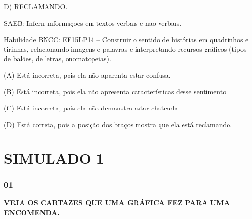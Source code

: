 D) RECLAMANDO.

SAEB: Inferir informações em textos verbais e não verbais.

Habilidade BNCC: EF15LP14 -- Construir o sentido de histórias em
quadrinhos e tirinhas, relacionando imagens e palavras e interpretando
recursos gráficos (tipos de balões, de letras, onomatopeias).

(A) Está incorreta, pois ela não aparenta estar confusa.

(B) Está incorreta, pois ela não apresenta características desse sentimento

(C) Está incorreta, pois ela não demonstra estar chateada.

(D) Está correta, pois a posição dos braços mostra que ela está
reclamando.

\section{SIMULADO 1}\label{simulado-1}

\subsubsection{01}\label{section-26}

\textbf{VEJA OS CARTAZES QUE UMA GRÁFICA FEZ PARA UMA ENCOMENDA.}


